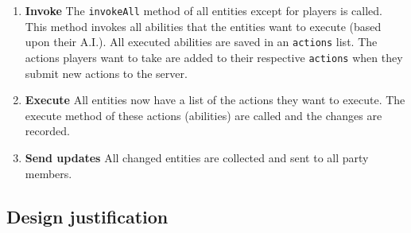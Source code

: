 \documentclass[../main.tex]{subfiles}
\begin{document}
        \begin{enumerate}
            \item \textbf{Invoke} The \texttt{invokeAll} method of all entities except for players is called. This method invokes all abilities that the entities want to execute (based upon their A.I.). All executed abilities are saved in an \texttt{actions} list. The actions players want to take are added to their respective \texttt{actions} when they submit new actions to the server.
            \item \textbf{Execute} All entities now have a list of the actions they want to execute. The execute method of these actions (abilities) are called and the changes are recorded.
            \item \textbf{Send updates} All changed entities are collected and sent to all party members.
        \end{enumerate}
        
        
	\subsection{Design justification}
\end{document}
